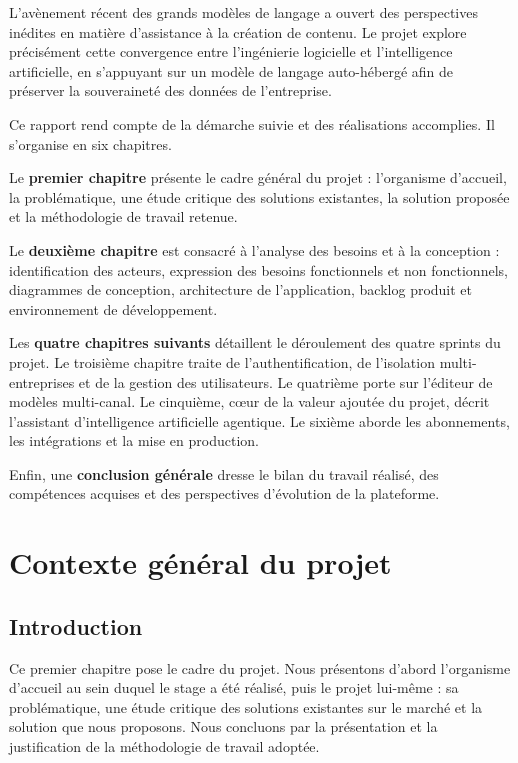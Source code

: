 \documentclass[12pt,a4paper,oneside]{report}
\begin{document}
L'avènement récent des grands modèles de langage a ouvert des perspectives
inédites en matière d'assistance à la création de contenu. Le projet
explore précisément cette convergence entre l'ingénierie logicielle et
l'intelligence artificielle, en s'appuyant sur un modèle de langage
auto-hébergé afin de préserver la souveraineté des données de l'entreprise.

Ce rapport rend compte de la démarche suivie et des réalisations
accomplies. Il s'organise en six chapitres.

Le \textbf{premier chapitre} présente le cadre général du projet :
l'organisme d'accueil, la problématique, une étude critique des solutions
existantes, la solution proposée et la méthodologie de travail retenue.

Le \textbf{deuxième chapitre} est consacré à l'analyse des besoins et à la
conception : identification des acteurs, expression des besoins
fonctionnels et non fonctionnels, diagrammes de conception, architecture de
l'application, backlog produit et environnement de développement.

Les \textbf{quatre chapitres suivants} détaillent le déroulement des quatre
sprints du projet. Le troisième chapitre traite de l'authentification, de
l'isolation multi-entreprises et de la gestion des utilisateurs. Le
quatrième porte sur l'éditeur de modèles multi-canal. Le cinquième, c\oe{}ur
de la valeur ajoutée du projet, décrit l'assistant d'intelligence
artificielle agentique. Le sixième aborde les abonnements, les
intégrations et la mise en production.

Enfin, une \textbf{conclusion générale} dresse le bilan du travail réalisé,
des compétences acquises et des perspectives d'évolution de la plateforme.

\chapter{Contexte général du projet}
\label{chap:contexte}

\section*{Introduction}
Ce premier chapitre pose le cadre du projet. Nous présentons d'abord
l'organisme d'accueil au sein duquel le stage a été réalisé, puis le
projet lui-même : sa problématique, une étude critique des solutions
existantes sur le marché et la solution que nous proposons. Nous concluons
par la présentation et la justification de la méthodologie de travail
adoptée.
\end{document}

